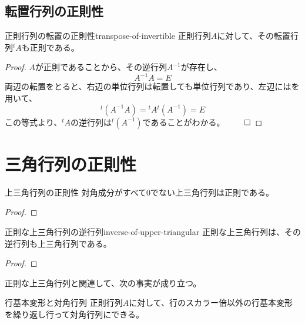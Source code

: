 \documentclass[../../../topic_linear-algebra]{subfiles}
\begin{document}
\subsection{転置行列の正則性}

\begin{theorem}{正則行列の転置の正則性}{transpose-of-invertible}
  正則行列$A$に対して、その転置行列${}^t A$も正則である。
\end{theorem}

\begin{proof}
  $A$が正則であることから、その逆行列$A^{-1}$が存在し、
  \begin{equation*}
    A^{-1}A = E
  \end{equation*}
  両辺の転置をとると、右辺の単位行列は転置しても単位行列であり、左辺にはを用いて、
  \begin{equation*}
    {}^t(A^{-1}A) = {}^t A {}^t (A^{-1}) = E
  \end{equation*}
  この等式より、${}^t A$の逆行列は${}^t (A^{-1})$であることがわかる。 $\qed$
\end{proof}

\sectionline
\section{三角行列の正則性}

\begin{theorem*}{上三角行列の正則性}
  対角成分がすべて0でない上三角行列は正則である。
\end{theorem*}

\begin{proof}
\end{proof}

\br

\begin{theorem}{正則な上三角行列の逆行列}{inverse-of-upper-triangular}
  正則な上三角行列は、その逆行列も上三角行列である。
\end{theorem}

\begin{proof}
  \todo{}
\end{proof}

\br

正則な上三角行列と関連して、次の事実が成り立つ。

\begin{theorem*}{行基本変形と対角行列}
  正則行列$A$に対して、行のスカラー倍以外の行基本変形を繰り返し行って対角行列にできる。
\end{theorem*}
\end{document}
